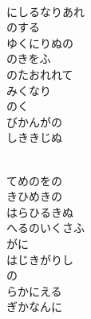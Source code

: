 \documentclass[10pt,b5j]{tarticle} %
\begin{document}
\begin{enumerate}
\begin{minipage}[c]{\blocksize}
        \vspace{\linespace}
        \item~\\
        にしるなりあれ\\
        のする\\
        ゆくにりぬの\\
        のきをふ\\
        のたおれれて\\
        みくなり\\
        のく\\
        びかんがの\\
        しききじぬ
        
        \vspace{\linespace}
        \item~\\
        てめのをの\\
        きひめきの\\
        はらひるきぬ\\
        へるのいくさふ\\
        がに\\
        はじきがりし\\
        の\\
        らかにえる\\
        ぎかなんに
    
    \end{minipage}
\end{enumerate} %
\end{document}
